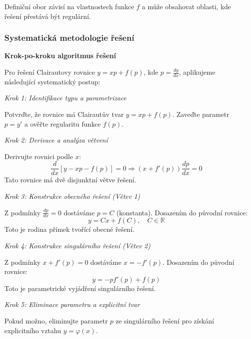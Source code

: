 Definiční obor závisí na vlastnostech funkce $f$ a může obsahovat oblasti, kde řešení přestává být regulární.

\subsubsection{Systematická metodologie řešení}
\label{subsubsec:metodologie-reseni}

\noindent\textbf{Krok-po-kroku algoritmus řešení}

Pro řešení Clairautovy rovnice $y = xp + f(p)$, kde $p = \frac{dy}{dx}$, aplikujeme následující systematický postup:

\vspace{1\baselineskip}

\noindent\textit{Krok 1: Identifikace typu a parametrizace}

Potvrďte, že rovnice má Clairautův tvar $y = xp + f(p)$. Zaveďte parametr $p = y'$ a ověřte regularitu funkce $f(p)$.

\vspace{1\baselineskip}

\noindent\textit{Krok 2: Derivace a analýza větvení}

Derivujte rovnici podle $x$:
\[
\frac{d}{dx}[y - xp - f(p)] = 0 \Rightarrow (x + f'(p))\frac{dp}{dx} = 0
\]
Tato rovnice má dvě disjunktní větve řešení.

\vspace{1\baselineskip}

\noindent\textit{Krok 3: Konstrukce obecného řešení (Větev 1)}

Z podmínky $\frac{dp}{dx} = 0$ dostáváme $p = C$ (konstanta). Dosazením do původní rovnice:
\[
y = Cx + f(C), \quad C \in \mathbb{R}
\]
Toto je rodina přímek tvořící obecné řešení.

\vspace{1\baselineskip}

\noindent\textit{Krok 4: Konstrukce singulárního řešení (Větev 2)}

Z podmínky $x + f'(p) = 0$ dostáváme $x = -f'(p)$. Dosazením do původní rovnice:
\[
y = -pf'(p) + f(p)
\]
Toto je parametrické vyjádření singulárního řešení.

\vspace{1\baselineskip}

\noindent\textit{Krok 5: Eliminace parametru a explicitní tvar}

Pokud možno, eliminujte parametr $p$ ze singulárního řešení pro získání explicitního vztahu $y = \varphi(x)$.

